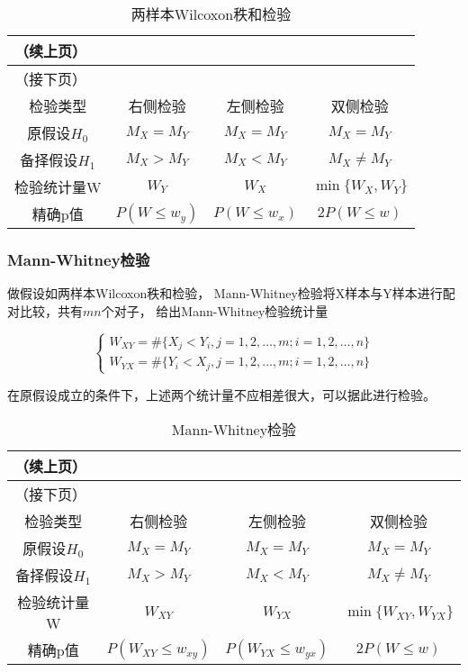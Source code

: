 \documentclass[UTF8]{ctexart}
\numberwithin{equation}{section}
\begin{document}
\begin{center}
    \begin{longtable}{cccc}
        \caption{两样本Wilcoxon秩和检验} \\ \toprule
        \endfirsthead
        \multicolumn{3}{l}{（续上页）} \\ \toprule
        \endhead
        \bottomrule
        \multicolumn{3}{l}{（接下页）} \\[2ex]
        \endfoot
        \bottomrule
        \endlastfoot
        检验类型 & 右侧检验 & 左侧检验 & 双侧检验 \\
        \hline
        原假设$H_0$ & $M_X = M_Y$ & $M_X = M_Y$ & $M_X = M_Y$ \\
        备择假设$H_1$ & $M_X > M_Y$ & $M_X < M_Y$ & $M_X \neq M_Y$ \\
        检验统计量W & $W_Y$ & $W_X$ & $\min \{W_X, W_Y\}$ \\
        精确p值 & $P(W \leq w_y)$ & $P(W \leq w_x)$ & $2 P(W \leq w)$ \\
    \end{longtable}
\end{center}

\subsubsection{Mann-Whitney检验}

做假设如两样本Wilcoxon秩和检验，
Mann-Whitney检验将X样本与Y样本进行配对比较，共有$mn$个对子，
给出Mann-Whitney检验统计量

\begin{equation}
    \begin{cases}
        W_{XY} = \# \{ X_j < Y_i, j=1,2,\dots,m;i=1,2,\dots,n \} \\
        W_{YX} = \# \{ Y_i < X_j, j=1,2,\dots,m;i=1,2,\dots,n \}
    \end{cases}
    \nonumber
\end{equation}

在原假设成立的条件下，上述两个统计量不应相差很大，可以据此进行检验。


\begin{center}
    \begin{longtable}{cccc}
        \caption{Mann-Whitney检验} \\ \toprule
        \endfirsthead
        \multicolumn{3}{l}{（续上页）} \\ \toprule
        \endhead
        \bottomrule
        \multicolumn{3}{l}{（接下页）} \\[2ex]
        \endfoot
        \bottomrule
        \endlastfoot
        检验类型 & 右侧检验 & 左侧检验 & 双侧检验 \\
        \hline
        原假设$H_0$ & $M_X = M_Y$ & $M_X = M_Y$ & $M_X = M_Y$ \\
        备择假设$H_1$ & $M_X > M_Y$ & $M_X < M_Y$ & $M_X \neq M_Y$ \\
        检验统计量W & $W_{XY}$ & $W_{YX}$ & $\min \{W_{XY}, W_{YX}\}$ \\
        精确p值 & $P(W_{XY} \leq w_{xy})$ & $P(W_{YX} \leq w_{yx})$ & $2 P(W \leq w)$ \\
    \end{longtable}
\end{center}
\end{document}
